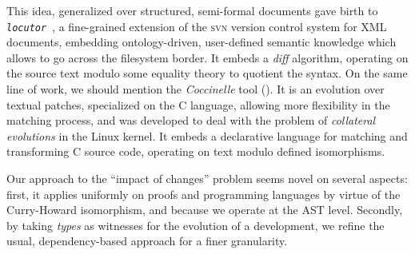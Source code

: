 \documentclass{article}
\newcommand{\remtext}[1]{\textcolor{bwgreen}{$\triangleright$ \textsl{#1}}}
\renewcommand{\remtext}[1]{}
\begin{document}
This idea, generalized over structured, semi-formal documents gave
birth to \texttt{\it locutor}~\cite{muller2008fine}, a fine-grained
extension of the \textsc{svn} version control system for XML
documents, embedding ontology-driven, user-defined semantic knowledge
which allows to go across the filesystem border. It embeds a
\emph{diff} algorithm, operating on the source text modulo some
equality theory to quotient the syntax. On the same line of work, we
should mention the \emph{Coccinelle} tool
(\cite{padioleau2008documenting}). It is an evolution over textual
patches, specialized on the C language, allowing more flexibility in
the matching process, and was developed to deal with the problem of
\emph{collateral evolutions} in the Linux kernel. It embeds a
declarative language for matching and transforming C source code,
operating on text modulo defined isomorphisms.

Our approach to the ``impact of changes'' problem seems novel on
several aspects: first, it applies uniformly on proofs and programming
languages by virtue of the Curry-Howard isomorphism, and because we
operate at the AST level. Secondly, by taking \emph{types} as 
witnesses for the evolution of a development, we refine the usual,
dependency-based approach for a finer granularity.







\end{document}
